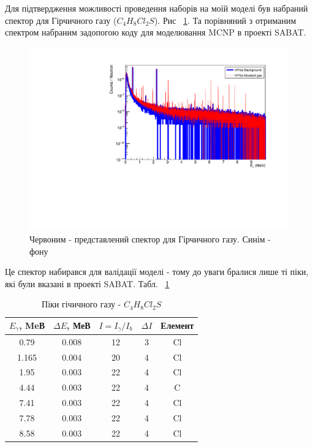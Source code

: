 \documentclass[a4paper, 14pt]{article}
\numberwithin{equation}{section}
\numberwithin{table}{section}
\begin{document}
	Для підтвердження можливості проведення наборів на моїй моделі був набраний спектор для Гірчичного газу ($C_4H_8Cl_2S$). Рис ~\ref{ris:MustBackAllLogSm}. Та порівняний з отриманим спектром набраним задопогою коду для моделювання MCNP в проекті SABAT.
	\begin{figure}[hbt!]
		\centering \includegraphics[width=1\textwidth]{res/smMustFonAll.pdf}
		\caption{Червоним - представлений спектор для Гірчичного газу. Синім - фону} 
		\label{ris:MustBackAllLogSm}	
	\end{figure} 
	Це спектор набирався для валідації моделі - тому до уваги бралися лише ті піки, які були вказані в проекті SABAT. Табл. ~\ref{tabl:ResultsMustard}
	\begin{table}[h]
		\centering
		\begin{tabular}{|c|c|c|c|c|} 
			\hline
			$E_{\gamma}$, MeВ & $\Delta{E}$, МеВ & $I = I_{\gamma} / I_{b}$ & $\Delta{I}$ & Елемент\\
			\hline
			0.79 & 0.008 & 12 & 3 & Cl\\
			\hline
			1.165 & 0.004 & 20 & 4 & Cl \\	
			\hline
			1.95 & 0.003 & 22 & 4 & Cl \\	
			\hline		
			4.44 & 0.003 & 22 & 4 & C \\	
			\hline
			7.41 & 0.003 & 22 & 4 & Cl\\	
			\hline
			7.78 & 0.003 & 22 & 4 & Cl\\	
			\hline			
			8.58 & 0.003 & 22 & 4 & Cl\\	
			\hline
		\end{tabular}
		\caption{Піки гічичного газу - $C_4H_8Cl_2S$} 
		\label{tabl:ResultsMustard}
	\end{table}
	
\end{document}
